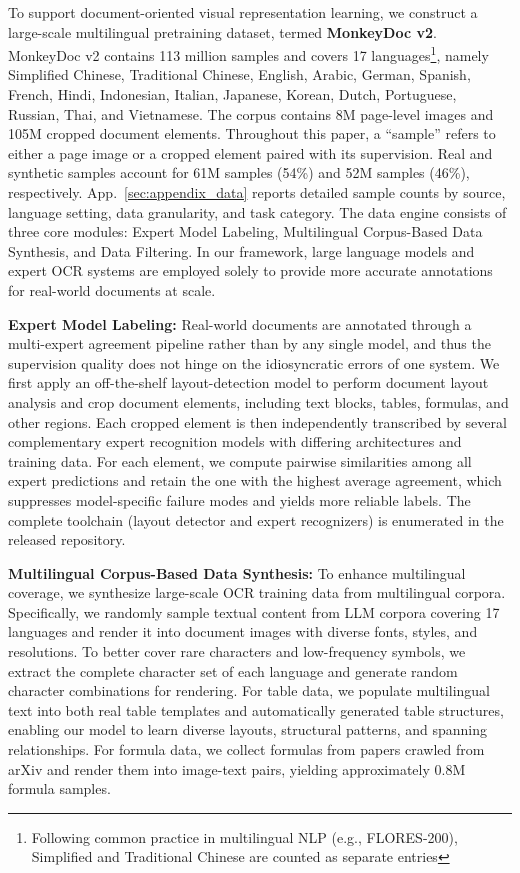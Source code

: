 \documentclass{article}
\begin{document}
To support document-oriented visual representation learning, we construct a large-scale multilingual pretraining dataset, termed \textbf{MonkeyDoc v2}. MonkeyDoc v2 contains 113 million samples and covers 17 languages\footnote{Following common practice in multilingual
NLP (e.g., FLORES-200), Simplified and Traditional Chinese are counted
as separate entries}, namely Simplified Chinese, Traditional Chinese, English, Arabic, German, Spanish, French, Hindi, Indonesian, Italian, Japanese, Korean, Dutch, Portuguese, Russian, Thai, and Vietnamese. 
The corpus contains 8M page-level images and 105M cropped document elements. Throughout this paper, a ``sample'' refers to either a page image or a cropped element paired with its supervision. Real and synthetic samples account for 61M samples (54\%) and 52M samples (46\%), respectively. 
App.~\ref{sec:appendix_data} reports detailed sample counts by source, language setting, data granularity, and task category.
The data engine consists of three core modules: Expert Model Labeling, Multilingual Corpus-Based Data Synthesis, and Data Filtering. In our framework, large language models and expert OCR systems are employed solely to provide more accurate annotations for real-world documents at scale.

\textbf{Expert Model Labeling:} Real-world documents are annotated through a multi-expert agreement pipeline rather than by any single model, and thus the supervision quality does not hinge on the idiosyncratic errors of one system. We first apply an off-the-shelf layout-detection model to perform document layout analysis and crop document elements, including text blocks, tables, formulas, and other regions. Each cropped element is then independently transcribed by several complementary expert recognition models with differing architectures and training data. For each element, we compute pairwise similarities among all expert predictions and retain the one with the highest average agreement, which suppresses model-specific failure modes and yields more reliable labels.
The complete toolchain (layout detector and expert recognizers) is enumerated in the released repository.


\textbf{Multilingual Corpus-Based Data Synthesis:} To enhance multilingual coverage, we synthesize large-scale OCR training data from multilingual corpora. Specifically, we randomly sample textual content from LLM corpora covering 17 languages and render it into document images with diverse fonts, styles, and resolutions. To better cover rare characters and low-frequency symbols, we extract the complete character set of each language and generate random character combinations for rendering.
For table data, we populate multilingual text into both real table templates and automatically generated table structures, enabling our model to learn diverse layouts, structural patterns, and spanning relationships.
For formula data, we collect formulas from papers crawled from arXiv and render them into image-text pairs, yielding approximately 0.8M formula samples.
\end{document}
